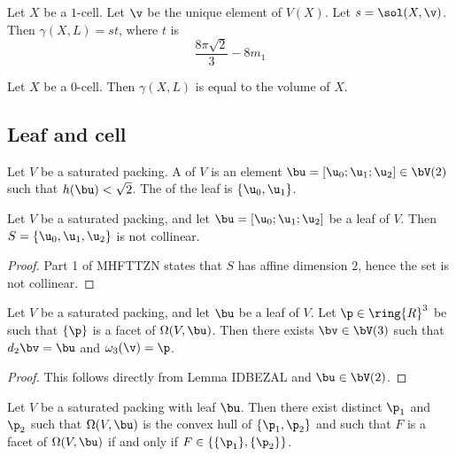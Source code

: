 \begin{lemma} Let $X$ be a $1$-cell.  Let $\v$ be the unique element of $V(X)$.
Let $s=\sol(X,\v)$.  Then $\gamma(X,L)=s t$, where $t$ is
\[
\frac{8\pi \sqrt2}{3} - 8 m_1
\]
\end{lemma}

\begin{lemma} Let $X$ be a $0$-cell.  Then $\gamma(X,L)$ is equal to
the volume of $X$.
\end{lemma}


\subsection{Leaf and cell}

\begin{definition}[leaf] 
Let $V$ be a saturated packing.  A  of $V$ is an element $\bu=[\u_0;\u_1;\u_2] \in \bV(2)$ such
that $h(\bu) < \sqrt2$.  The  of the leaf is $\{\u_0,\u_1\}$.
\end{definition}





\begin{lemma} Let $V$ be a saturated packing, and let $\bu = [\u_0;\u_1;\u_2]$ be a leaf of $V$.
Then $S=\{\u_0,\u_1,\u_2\}$ is not collinear.
\end{lemma}

\begin{proof}  Part 1 of MHFTTZN states that $S$ has affine dimension $2$, hence the set is not
collinear.
\end{proof}





\begin{lemma}\label{lemma:facetv}  Let $V$ be a saturated packing, and let $\bu$ be a leaf of $V$.  Let
$\p\in\ring{R}^3$ be such that $\{\p\}$ is a facet of $\Omega(V,\bu)$.  Then
there exists $\bv\in \bV(3)$ such that $d_2\bv = \bu$ and $\omega_3(\v)=\p$.
\end{lemma}

\begin{proof} This follows directly from Lemma IDBEZAL and $\bu\in \bV(2)$.
\end{proof}

\begin{lemma}\label{lemma:p1p2} 
Let $V$ be a saturated packing with leaf $\bu$.  Then there exist distinct $\p_1$ and $\p_2$ such
that $\Omega(V,\bu)$ is the convex hull of $\{\p_1,\p_2\}$ and such that
$F$ is a facet of $\Omega(V,\bu)$ if and only if $F\in \{\{\p_1\},\{\p_2\}\}$.
\end{lemma}

